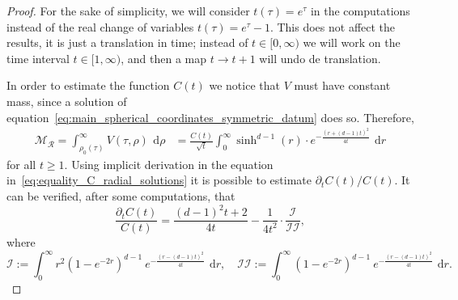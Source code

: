 \documentclass[12pt,longbibliography]{article}
\def\d{\,\mathrm{d}}
\def\d{\,\mathrm{d}}
\theoremstyle{definition}
\theoremstyle{remark}
\theoremstyle{example}
\begin{document}
\begin{proof}
	For the sake of simplicity, we will consider $t(\tau)=e^\tau$ in the computations instead of the real change of variables $t(\tau)=e^\tau-1$. This does not affect the results, it is just a translation in time; instead of $t\in [0,\infty)$ we will work on the time interval $t\in[1, \infty)$, and then a map $t\to t+1$ will undo de translation.
	
	In order to estimate the function $C(t)$ we notice that $V$ must have constant mass, since a solution of equation~\eqref{eq:main_spherical_coordinates_symmetric_datum} does so. Therefore,
	\begin{equation}\label{eq:equality_C_radial_solutions}
		\begin{aligned}
			\mathcal{M}_{\mathcal{R}} = \int_{\rho_0(\tau)}^\infty V(\tau, \rho)\ \d \rho &= \frac{C(t)}{\sqrt{t}}\int_{0}^\infty \sinh^{d-1}(r)\cdot e^{- \frac{\left(r + (d-1)t\right)^2}{4t}}\ \d r
		\end{aligned}
	\end{equation}	
	for all $t\geq 1$. Using implicit derivation in the equation in~\eqref{eq:equality_C_radial_solutions} it is possible to estimate $\partial_t C(t)/C(t)$. It can be verified, after some computations, that
	\begin{equation}\label{eq:quotient_C(t)}
		\frac{\partial_t C(t)}{C(t)} = \frac{(d-1)^2t+2}{4t} - \frac{1}{4t^2}\cdot \frac{\mathcal{I}}{\mathcal{II}},
	\end{equation}
	where
	\[
	\mathcal{I}:= \int_0^\infty r^2 (1-e^{-2r})^{d-1}\ e^{- \frac{\left(r - (d-1)t\right)^2}{4t}}\ \d r,\quad  \mathcal{II}:= \int_0^\infty (1-e^{-2r})^{d-1}\ e^{- \frac{\left(r - (d-1)t\right)^2}{4t}}\ \d r.
	\]
	

\end{proof}
\end{document}
